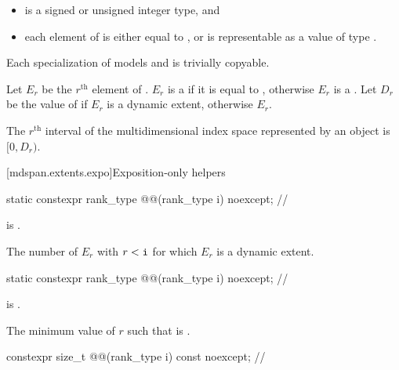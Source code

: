 \pnum
\mandates
\begin{itemize}
\item
{} is a signed or unsigned integer type, and
\item
each element of  is either equal to , or
is representable as a value of type .
\end{itemize}

\pnum
Each specialization of  models  and
is trivially copyable.

\pnum
Let $E_r$ be the $r^\text{th}$ element of .
$E_r$ is a  if it is equal to ,
otherwise $E_r$ is a .
Let $D_r$ be the value of 
if $E_r$ is a dynamic extent,
otherwise $E_r$.

\pnum
The $r^\text{th}$ interval of the multidimensional index space
represented by an  object is $[0, D_r)$.

[mdspan.extents.expo]{Exposition-only helpers}

\begin{itemdecl}
static constexpr rank_type @@(rank_type i) noexcept;         // \expos
\end{itemdecl}

\begin{itemdescr}
\pnum
\expects
{} is .

\pnum
\returns
The number of $E_r$ with $r < \texttt{i}$ for which $E_r$ is a dynamic extent.
\end{itemdescr}

\begin{itemdecl}
static constexpr rank_type @@(rank_type i) noexcept;     // \expos
\end{itemdecl}

\begin{itemdescr}
\pnum
\expects
{} is .

\pnum
\returns
The minimum value of $r$
such that  is .
\end{itemdescr}

\begin{itemdecl}
constexpr size_t @@(rank_type i) const noexcept;       // \expos
\end{itemdecl}

